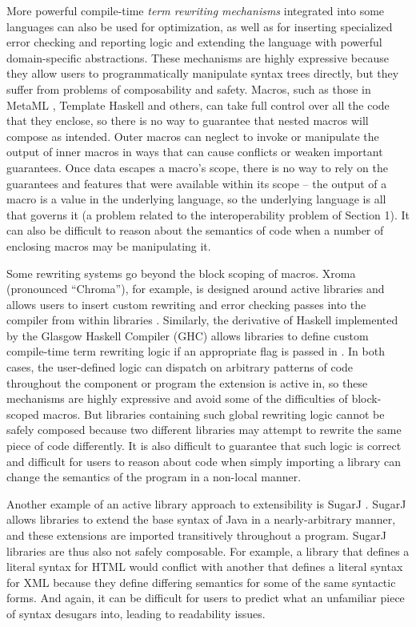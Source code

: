 More powerful compile-time \emph{term rewriting mechanisms} integrated into some languages can also be used for optimization, as well as for inserting specialized error checking and reporting\- logic and extending the language with powerful domain-specific abstractions. These mechanisms are highly expressive because they allow users to programmatically manipulate syntax trees directly, but they suffer from problems of composability and safety. Macros, such as those in MetaML \cite{metaml}, Template Haskell \cite{template_haskell} and others, can take full control over all the code that they enclose, so there is no way to guarantee that nested macros will compose as intended. Outer macros can neglect to invoke or  manipulate the output of inner macros in ways that can cause conflicts or weaken important guarantees. Once data escapes a macro's scope, there is no way to rely on the guarantees and features that were available within its scope -- the output of a macro is a value in the underlying language, so the underlying language is all that governs it (a problem related to the interoperability problem of Section 1). It can also be difficult to reason about the semantics of code when a number of enclosing macros may be manipulating it.

Some rewriting systems go beyond the block scoping of macros. Xroma (pronounced ``Chroma''), for example, is designed around active libraries and allows users to insert custom rewriting and error checking passes into the compiler from within libraries \cite{xroma}. Similarly, the derivative of Haskell implemented by the Glasgow Haskell Compiler (GHC) allows libraries to define custom compile-time term rewriting logic if an appropriate flag is passed in \cite{haskell-rewrite}. In both cases, the user-defined logic can dispatch on arbitrary patterns of code throughout the component or program the extension is active in, so these mechanisms are highly expressive and avoid some of the difficulties of block-scoped macros. But libraries containing such global rewriting logic cannot be safely composed because two different libraries may attempt to rewrite the same piece of code differently. It is also difficult to guarantee that such logic is correct and difficult for users to reason about code when simply importing a library can change the semantics of the program in a non-local manner.

Another example of an active library approach to extensibility is SugarJ \cite{sugarj}. SugarJ allows libraries to extend the base syntax of Java in a nearly-arbitrary manner, and these extensions are imported transitively throughout a program. SugarJ libraries are thus also not safely composable. For example, a library that defines a literal syntax for HTML would conflict with another that defines a literal syntax for XML because they define differing semantics for some of the same syntactic forms. And again, it can be difficult for users to predict what an unfamiliar piece of syntax desugars into, leading to readability issues.

